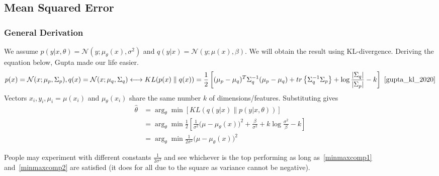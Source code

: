 \documentclass{article}
\numberwithin{equation}{subsection}
\begin{document}
\subsection{Mean Squared Error}
\subsubsection{General Derivation}
\label{mse_derivation}
We assume $p(y|x,\theta) = \mathcal{N}(y; \mu_\theta(x),\sigma^2)$ and $q(y|x) = \mathcal{N}(y; \mu(x),\beta)$. We will obtain the result using KL-divergence. Deriving the equation below, Gupta made our life easier.
\begin{equation}
    p(x) = \mathcal{N}(x;\mu_p,\Sigma_p), q(x) = \mathcal{N}(x;\mu_q,\Sigma_q) \longleftrightarrow KL(p(x) \parallel q(x)) = \frac{1}{2}\left[(\mu_p-\mu_q)^T\Sigma_q^{-1}(\mu_p-\mu_q) + tr\left\{\Sigma_q^{-1}\Sigma_p\right\}+\log\frac{|\Sigma_q|}{|\Sigma_p|} - k\right]~\cite{gupta_kl_2020}
\end{equation}
Vectors $x_i, y_i, \mu_i=\mu(x_i)$ and $\mu_\theta(x_i)$ share the same number $k$ of dimensions/features. Substituting gives
\begin{align}
    \hat{\theta} 
    &= \arg_\theta \min[KL(q(y|x) \parallel p(y|x,\theta))]\\
    &= \arg_\theta \min\frac{1}{2}\left[\frac{1}{\sigma^2}\big(\mu-\mu_\theta(x)\big)^2 + \frac{\beta}{\sigma^2}+k\log\frac{\sigma^2}{\beta} - k\right]\\
    &= \arg_\theta \min\frac{1}{2\sigma^2}\big(\mu-\mu_\theta(x)\big)^2\label{mse_derivation_res2}
\end{align}

People may experiment with different constants $\frac{1}{2\sigma^2}$ and see whichever is the top performing as long as~\ref{minmaxcomp1} and~\ref{minmaxcomp2} are satisfied (it does for all due to the square as variance cannot be negative).
\end{document}
